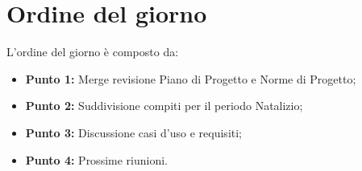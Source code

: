 \section{Ordine del giorno}
L'ordine del giorno è composto da: 
\begin{itemize}
	\item \textbf{Punto 1:} Merge revisione Piano di Progetto e Norme di Progetto;
	\item \textbf{Punto 2:} Suddivisione compiti per il periodo Natalizio;
	\item \textbf{Punto 3:} Discussione casi d'uso e requisiti;
	\item \textbf{Punto 4:} Prossime riunioni.
\end{itemize}
